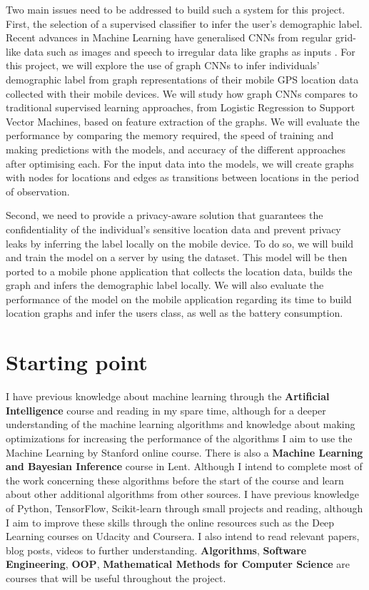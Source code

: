 \documentclass[12pt,a4paper,twoside]{article}
\begin{document}
Two main issues need to be addressed to build such a system for this project. First, the selection of a supervised classifier to infer the user's demographic label. Recent advances in Machine Learning have generalised CNNs from regular grid-like data such as images and speech to irregular data like graphs as inputs \cite{CNN1,CNN2,CNN3}. For this project, we will explore the use of graph CNNs to infer individuals' demographic label from graph representations of their mobile GPS location data collected with their mobile devices. We will study how graph CNNs compares to traditional supervised learning approaches, from Logistic Regression to Support Vector Machines, based on feature extraction of the graphs. We will evaluate the performance by comparing the memory required, the speed of training and making predictions with the models, and accuracy of the different approaches after optimising each. For the input data into the models, we will create graphs with nodes for locations and edges as transitions between locations in the period of observation.

Second, we need to provide a privacy-aware solution that guarantees the confidentiality of the individual’s sensitive location data and prevent privacy leaks by inferring the label locally on the mobile device. To do so, we will build and train the model on a server by using the dataset. This model will be then ported to a mobile phone application that collects the location data, builds the graph and infers the demographic label locally. We will also evaluate the performance of the model on the mobile application regarding its time to build location graphs and infer the users class, as well as the battery consumption.
\section*{Starting point}
I have previous knowledge about machine learning through the \textbf{Artificial Intelligence} course and reading in my spare time, although for a deeper understanding of the machine learning algorithms and knowledge about making optimizations for increasing the performance of the algorithms I aim to use the Machine Learning by Stanford online course\cite{MLcourse}. There is also a \textbf{Machine Learning and Bayesian Inference} course in Lent. Although I intend to complete most of the work concerning these algorithms before the start of the course and learn about other additional algorithms from other sources. I have previous knowledge of Python, TensorFlow, Scikit-learn \cite{tensorflow,scikitlearn} through small projects and reading, although I aim to improve these skills through the online resources such as the Deep Learning courses on Udacity and Coursera\cite{udacity, coursera}. I also intend to read relevant papers, blog posts, videos to further understanding. \textbf{Algorithms}, \textbf{Software Engineering}, \textbf{OOP}, \textbf{Mathematical Methods for Computer Science} are courses that will be useful throughout the project.\\
\end{document}
